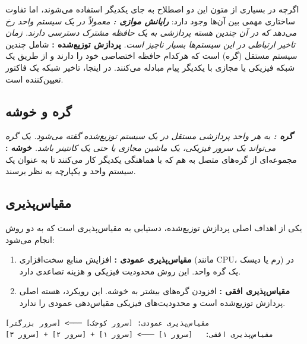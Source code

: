\documentclass[12pt,a4paper,openany]{book}
\begin{document}
اگرچه در بسیاری از متون این دو اصطلاح به جای یکدیگر استفاده می‌شوند، اما تفاوت ساختاری مهمی بین آن‌ها وجود دارد: \textit{ \textbf{رایانش موازی :} معمولاً در یک سیستم واحد رخ می‌دهد که در آن چندین هسته پردازشی  به یک حافظه مشترک  دسترسی دارند. زمان تاخیر ارتباطی در این سیستم‌ها بسیار ناچیز است. } \textbf{پردازش توزیع‌شده :} شامل چندین سیستم مستقل (گره) است که هرکدام حافظه اختصاصی  خود را دارند و از طریق یک شبکه فیزیکی یا مجازی با یکدیگر پیام مبادله می‌کنند. در اینجا، تاخیر شبکه  یک فاکتور تعیین‌کننده است.

\subsection{گره  و خوشه }

\textit{ \textbf{گره :} به هر واحد پردازشی مستقل در یک سیستم توزیع‌شده گفته می‌شود. یک گره می‌تواند یک سرور فیزیکی، یک ماشین مجازی  یا حتی یک کانتینر  باشد. } \textbf{خوشه :} مجموعه‌ای از گره‌های متصل به هم که با هماهنگی یکدیگر کار می‌کنند تا به عنوان یک سیستم واحد و یکپارچه به نظر برسند.

\subsection{مقیاس‌پذیری }

یکی از اهداف اصلی پردازش توزیع‌شده، دستیابی به مقیاس‌پذیری است که به دو روش انجام می‌شود:

\begin{enumerate}
\item \textbf{مقیاس‌پذیری عمودی :} افزایش منابع سخت‌افزاری (مانند CPU، رم یا دیسک) در یک گره واحد. این روش محدودیت فیزیکی و هزینه تصاعدی دارد.
\item \textbf{مقیاس‌پذیری افقی :} افزودن گره‌های بیشتر به خوشه. این رویکرد، هسته اصلی پردازش توزیع‌شده است و محدودیت‌های فیزیکی مقیاس‌دهی عمودی را ندارد.
\end{enumerate}
\begin{LTR}
\begin{verbatim}
مقیاس‌پذیری عمودی: [سرور کوچک] ───> [سرور بزرگتر]
مقیاس‌پذیری افقی:   [سرور ۱] ───> [سرور ۱] + [سرور ۲] + [سرور ۳]
\end{verbatim}
\end{LTR}
\end{document}
